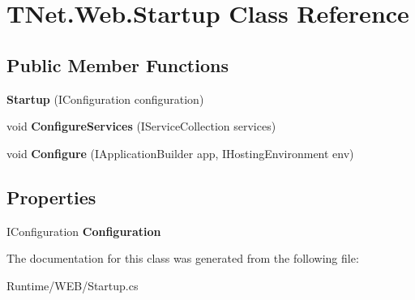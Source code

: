 \hypertarget{class_t_net_1_1_web_1_1_startup}{}\section{T\+Net.\+Web.\+Startup Class Reference}
\label{class_t_net_1_1_web_1_1_startup}
\subsection*{Public Member Functions}
\begin{DoxyCompactItemize}
\item 
\mbox{\label{class_t_net_1_1_web_1_1_startup_a5d6bc228c2b3d2c0d44e682df7653a4a}} 
{\bfseries Startup} (I\+Configuration configuration)
\item 
\mbox{\label{class_t_net_1_1_web_1_1_startup_a2c7d4c3a6f0ba9b3a28b4454479e20f3}} 
void {\bfseries Configure\+Services} (I\+Service\+Collection services)
\item 
\mbox{\label{class_t_net_1_1_web_1_1_startup_a784d395792f2c811d12940af1cf1176c}} 
void {\bfseries Configure} (I\+Application\+Builder app, I\+Hosting\+Environment env)
\end{DoxyCompactItemize}
\subsection*{Properties}
\begin{DoxyCompactItemize}
\item 
\mbox{\label{class_t_net_1_1_web_1_1_startup_a6d3858fa9941a6a47bbdad23c7ca9049}} 
I\+Configuration {\bfseries Configuration}
\end{DoxyCompactItemize}


The documentation for this class was generated from the following file\+:\begin{DoxyCompactItemize}
\item 
Runtime/\+W\+E\+B/Startup.\+cs\end{DoxyCompactItemize}
